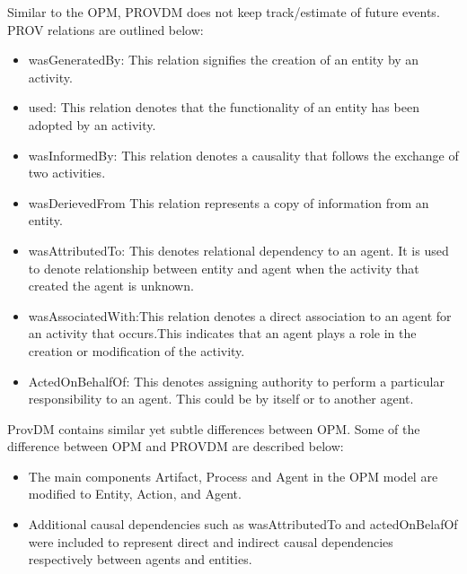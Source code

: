 Similar to the OPM, PROV\-DM does not keep track/estimate of future events. PROV relations are outlined below:


\begin{itemize}
\item wasGeneratedBy: This relation signifies the creation of an entity by an activity. 

\item used: This relation denotes that the functionality of an entity has been adopted by an activity.

\item wasInformedBy: This relation denotes a causality that follows the exchange of two activities.

\item wasDerievedFrom This relation represents a copy of information from an entity. 

\item wasAttributedTo: This denotes relational dependency to an agent. It is used to denote relationship between entity and agent when the activity that created the agent is unknown.

\item wasAssociatedWith:This relation denotes a direct association to an agent for an activity that occurs.This indicates that an agent plays a role in the creation or modification of the activity.

\item ActedOnBehalfOf: This denotes assigning authority to perform a particular responsibility to an agent. This could be by itself or to another agent.



\end{itemize}

Prov\-DM contains similar yet subtle differences between OPM. Some of the difference between OPM and PROV\-DM are described below:

\begin{itemize}

\item The main components Artifact, Process and Agent in the OPM model are modified to Entity, Action, and Agent. 

\item Additional causal dependencies such as wasAttributedTo and actedOnBelafOf were included to represent direct and indirect causal dependencies respectively between agents and entities.

\end{itemize}

